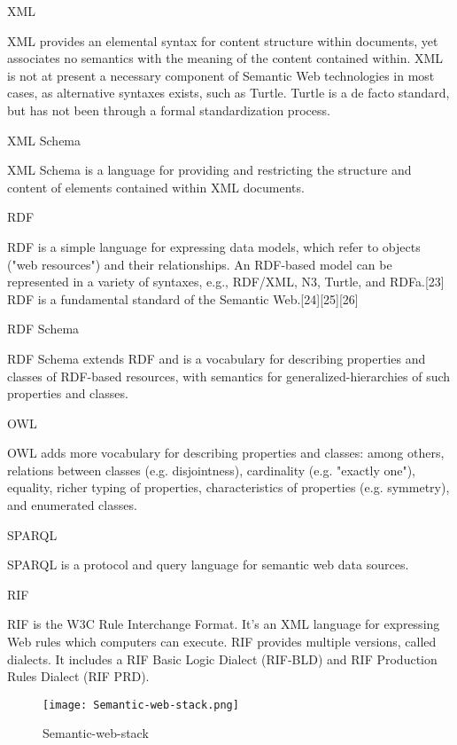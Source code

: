 \begin{compactitem}
\item XML

XML provides an elemental syntax for content structure within documents, yet associates no semantics with the meaning of the content contained within. XML is not at present a necessary component of Semantic Web technologies in most cases, as alternative syntaxes exists, such as Turtle. Turtle is a de facto standard, but has not been through a formal standardization process.
\item XML Schema

XML Schema is a language for providing and restricting the structure and content of elements contained within XML documents.
\item RDF

RDF is a simple language for expressing data models, which refer to objects ("web resources") and their relationships. An RDF-based model can be represented in a variety of syntaxes, e.g., RDF/XML, N3, Turtle, and RDFa.[23] RDF is a fundamental standard of the Semantic Web.[24][25][26]

\item RDF Schema

RDF Schema extends RDF and is a vocabulary for describing properties and classes of RDF-based resources, with semantics for generalized-hierarchies of such properties and classes.
\item OWL

OWL adds more vocabulary for describing properties and classes: among others, relations between classes (e.g. disjointness), cardinality (e.g. "exactly one"), equality, richer typing of properties, characteristics of properties (e.g. symmetry), and enumerated classes.
\item SPARQL 

SPARQL is a protocol and query language for semantic web data sources.

\item RIF

RIF is the W3C Rule Interchange Format. It's an XML language for expressing Web rules which computers can execute. RIF provides multiple versions, called dialects. It includes a RIF Basic Logic Dialect (RIF-BLD) and RIF Production Rules Dialect (RIF PRD).
\end{compactitem}

\begin{figure}[!h]
\centering
\texttt{[image: Semantic-web-stack.png]}
\caption{Semantic-web-stack}
\label{Semantic-web-stack}
\end{figure}


